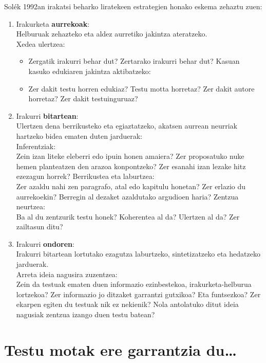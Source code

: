 \documentclass[
]{book}
\providecommand{\tightlist}{%
  \setlength{\itemsep}{0pt}\setlength{\parskip}{0pt}}
\begin{document}
Solék 1992an irakatsi beharko liratekeen estrategien honako eskema zehaztu zuen:

\begin{enumerate}
\def\labelenumi{\arabic{enumi}.}
\tightlist
\item
  Irakurketa \textbf{aurrekoak}:\\
  Helburuak zehazteko eta aldez aurretiko jakintza ateratzeko.\\
  Xedea ulertzea:

  \begin{itemize}
  \tightlist
  \item
    Zergatik irakurri behar dut? Zertarako irakurri behar dut?
    Kasuan kasuko edukiaren jakintza aktibatzeko:\\
  \item
    Zer dakit testu horren edukiaz? Testu motta horretaz? Zer dakit autore horretaz? Zer dakit testuinguruaz?
  \end{itemize}
\item
  Irakurri \textbf{bitartean}:\\
  Ulertzen dena berrikusteko eta egiaztatzeko, akatsen aurrean neurriak hartzeko bidea ematen duten jarduerak:\\
  Inferentziak:\\
  Zein izan liteke eleberri edo ipuin honen amaiera? Zer proposatuko nuke hemen planteatzen den arazoa konpontzeko? Zer esanahi izan lezake hitz ezezagun horrek?
  Berrikustea eta laburtzea:\\
  Zer azaldu nahi zen paragrafo, atal edo kapitulu honetan? Zer erlazio du aurrekoekin? Berregin al dezaket azaldutako argudioen haria?
  Zentzua neurtzea:\\
  Ba al du zentzurik testu honek? Koherentea al da? Ulertzen al da? Zer zailtasun ditu?
\item
  Irakurri \textbf{ondoren}:\\
  Irakurri bitartean lortutako ezagutza laburtzeko, sintetizatzeko eta hedatzeko jarduerak.\\
  Arreta ideia nagusira zuzentzea:\\
  Zein da testuak ematen duen informazio ezinbestekoa, irakurketa-helburua lortzekoa? Zer informazio jo ditzaket garrantzi gutxikoa? Eta funtsezkoa? Zer ekarpen egiten du testuak nik ez nekienik? Nola antolatuko ditut ideia nagusiak zentzua izango duen testu batean?
\end{enumerate}

\hypertarget{testu-motak-ere-garrantzia-du}{%
\section{Testu motak ere garrantzia du\ldots{}}\label{testu-motak-ere-garrantzia-du}}
\end{document}
